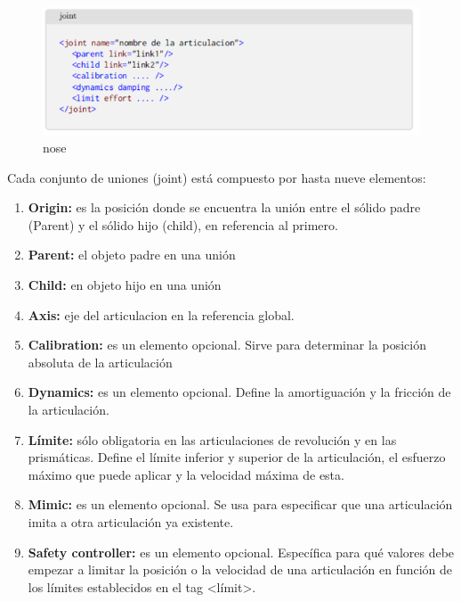         \begin{figure}[htb]
            \centering
            \includegraphics[width=0.8\linewidth]{Main/Chapter3/Images3/3-8/codigo-joint.png}
            \caption{nose}
            \label{f:Cap3-8_nose_nose}
        \end{figure} 
        
        Cada conjunto de uniones (joint) está compuesto por hasta nueve elementos:
        
         \begin{enumerate}      
            \item \textbf{Origin:} es la posición donde se encuentra la unión entre el sólido padre (Parent) y el sólido hijo (child), en referencia al primero.
            \item \textbf{Parent:} el objeto padre en una unión
            \item \textbf{Child:} en objeto hijo en una unión
            \item \textbf{Axis:} eje del articulacion en la referencia global.
            \item \textbf{Calibration:} es un elemento opcional. Sirve para determinar la posición absoluta de la articulación
            \item \textbf{Dynamics:} es un elemento opcional. Define la amortiguación y la fricción de la articulación.
            \item \textbf{Límite:} sólo obligatoria en las articulaciones de revolución y en las prismáticas. Define el límite inferior y superior de la articulación, el esfuerzo máximo que puede aplicar y la velocidad máxima de esta.
            \item \textbf{Mimic:} es un elemento opcional. Se usa para especificar que una articulación imita a otra articulación ya existente. 
            \item \textbf{Safety controller:} es un elemento opcional. Específica para qué valores debe empezar a limitar la posición o la velocidad de una articulación en función de los límites establecidos en el tag <límit>.
        \end{enumerate}
        
